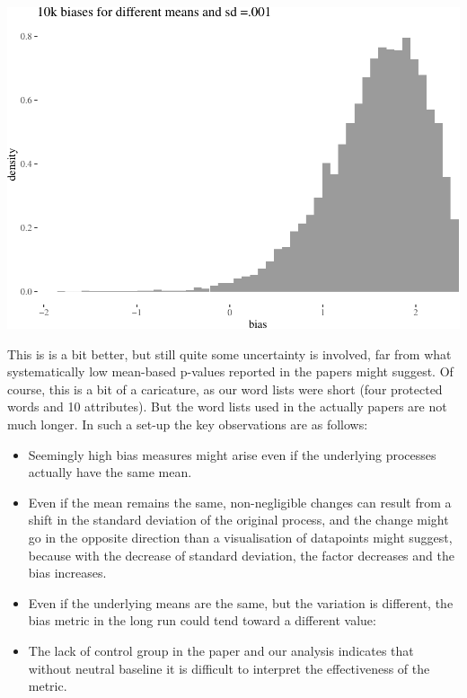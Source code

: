 \documentclass[10pt,dvipsnames,enabledeprecatedfontcommands]{scrartcl}
\begin{document}
\begin{center}\includegraphics[width=1\linewidth]{paperDraft_files/figure-latex/unnamed-chunk-16-1} \end{center}

\normalsize

This is is a bit better, but still quite some uncertainty is involved,
far from what systematically low mean-based p-values reported in the
papers might suggest. Of course, this is a bit of a caricature, as our
word lists were short (four protected words and 10 attributes). But the
word lists used in the actually papers are not much longer. In such a
set-up the key observations are as follows:

\begin{itemize}
\item
  Seemingly high bias measures might arise even if the underlying
  processes actually have the same mean.
\item
  Even if the mean remains the same, non-negligible changes can result
  from a shift in the standard deviation of the original process, and
  the change might go in the opposite direction than a visualisation of
  datapoints might suggest, because with the decrease of standard
  deviation, the factor decreases and the bias increases.
\item
  Even if the underlying means are the same, but the variation is
  different, the bias metric in the long run could tend toward a
  different value:
\item
  The lack of control group in the paper and our analysis indicates that
  without neutral baseline it is difficult to interpret the
  effectiveness of the metric.
\end{itemize}
\end{document}
